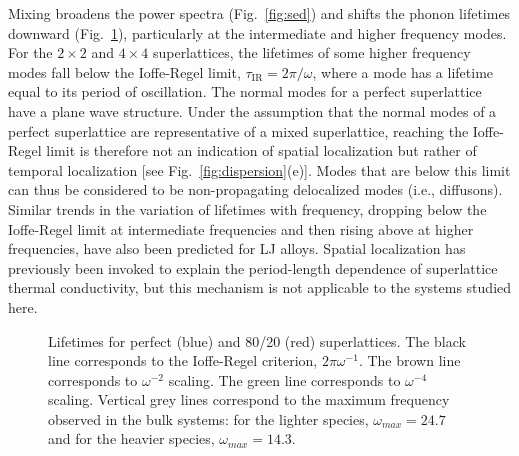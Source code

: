 \documentclass[aps,prb,preprint,preprintnumbers,amsmath,amssymb,floatfix,superscriptaddress]{revtex4}
\begin{document}
Mixing broadens the power spectra (Fig.~\ref{fig:sed}) and shifts the phonon lifetimes downward (Fig.~\ref{FIG:lifetime}), particularly at the intermediate and higher frequency modes. For the $2 \times 2$ and $ 4 \times 4$ superlattices,  the lifetimes of some higher frequency modes fall below the Ioffe-Regel limit, $\tau_\mathrm{IR} =2\pi/\omega$, where a mode has a lifetime equal to its period of oscillation. The normal modes for a perfect superlattice have a plane wave structure. Under the assumption that the normal modes of a perfect superlattice are representative of a mixed superlattice, reaching the Ioffe-Regel limit is therefore not an indication of spatial localization but rather of temporal localization [see Fig.~\ref{fig:dispersion}(e)]. Modes that are below this limit can thus be considered to be non-propagating delocalized modes (i.e., diffusons).\cite{allen_thermal_1993,allen1999diffusons} Similar trends in the variation of lifetimes with frequency, dropping below the Ioffe-Regel limit at intermediate frequencies and then rising above at higher frequencies, have also been predicted for LJ alloys.\cite{jason2013vc} Spatial localization has previously been invoked to explain the period-length dependence of superlattice thermal conductivity, \cite{PhysRevB.61.3091} but this mechanism is not applicable to the systems studied here.

\renewcommand{\textfraction}{0.0}
\begin{figure}%
\begin{center}
\renewcommand{\figure}{Fig.}
\caption{Lifetimes for perfect (blue) and 80/20 (red) superlattices. The black line corresponds to the Ioffe-Regel criterion, $2\pi\omega^{-1}$. The brown line corresponds to $\omega^{-2}$ scaling. The green line corresponds to $\omega^{-4}$ scaling. Vertical grey lines correspond to the maximum frequency observed in the bulk systems: for the lighter species, $\omega_{max}=24.7$ and for the heavier species, $\omega_{max}=14.3$. } 
\label{FIG:lifetime}
\end{center}
\end{figure}
\end{document}
